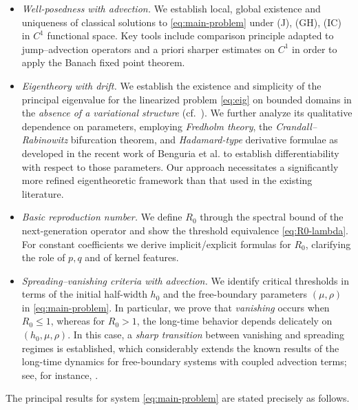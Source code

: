 \documentclass[a4paper,11pt]{amsart}
\theoremstyle{definition}
\numberwithin{equation}{section}
\theoremstyle{definition}
\begin{document}
\begin{itemize}
\item[(i)] \emph{Well-posedness with advection.} We establish local, global existence and uniqueness of classical solutions to \eqref{eq:main-problem} under (J), (GH), (IC) in $C^1$ functional space. Key tools include comparison principle adapted to jump–advection operators and a priori sharper estimates on $C^1$ in order to apply the Banach fixed point theorem.

\item[(ii)] \emph{Eigentheory with drift.} We establish the existence and simplicity of the principal eigenvalue for the linearized problem \eqref{eq:eig} on bounded domains in the \emph{absence of a variational structure} (cf.\ \cite{Berestycki2016a,Cao2019,NguyenVo2022,ThuVo2025}).
We further analyze its qualitative dependence on parameters, employing \emph{Fredholm theory}, the \emph{Crandall--Rabinowitz} bifurcation theorem, and \emph{Hadamard-type} derivative formulae as developed in the recent work of Benguria et al. \cite{Benguria2024} to establish differentiability with respect to those parameters.
Our approach necessitates a significantly more refined eigentheoretic framework than that used in the existing literature.


\item[(iii)] \emph{Basic reproduction number.} We define $R_0$ through the spectral bound of the next-generation operator and show the threshold equivalence \eqref{eq:R0-lambda}. For constant coefficients we derive implicit/explicit formulas for $R_0$, clarifying the role of $p,q$ and of kernel features.


\item[(iv)] \emph{Spreading--vanishing criteria with advection.} We identify critical thresholds in terms of the initial half-width $h_0$ and the free-boundary parameters $(\mu,\rho)$ in \eqref{eq:main-problem}.
In particular, we prove that \emph{vanishing} occurs when $R_0 \le 1$, whereas for $R_0 > 1$, the long-time behavior depends delicately on $(h_0,\mu,\rho)$.
In this case, a \emph{sharp transition} between vanishing and spreading regimes is established, which considerably extends the known results of the long-time dynamics for free-boundary systems with coupled advection terms;
see, for instance, \cite{Tang2024a,Tang2024b,NguyenVo2022,DuNi2020,Cao2019,Du}.

\end{itemize}


The principal results for system \eqref{eq:main-problem} are stated precisely as follows.
\end{document}
